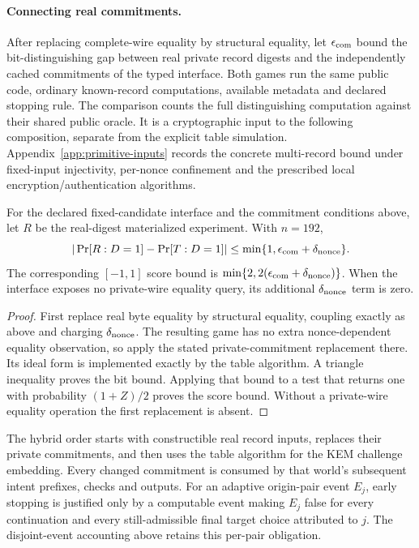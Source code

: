 \paragraph{Connecting real commitments.}
After replacing complete-wire equality by structural equality, let
$\epsilon_{\rm com}$ bound the bit-distinguishing gap between real private
record digests and the independently cached commitments of the typed
interface. Both games run the same public code, ordinary known-record
computations, available metadata and declared stopping rule. The comparison
counts the full distinguishing computation against their shared public oracle.
It is a cryptographic input to the following composition, separate from the
explicit table simulation. Appendix~\ref{app:primitive-inputs} records the
concrete multi-record bound under fixed-input injectivity, per-nonce
confinement and the prescribed local encryption/authentication algorithms.

\begin{corollary}
\label{cor:real-to-opaque}
For the declared fixed-candidate interface and the commitment conditions
above, let $R$ be the real-digest materialized experiment. With $n=192$,
\[
 |\Pr[R:D=1]-\Pr[T:D=1]|
 \leq\min\{1,\epsilon_{\rm com}+\delta_{\rm nonce}\}.
\]
The corresponding $[-1,1]$ score bound is
$\min\{2,2(\epsilon_{\rm com}+\delta_{\rm nonce})\}$.
When the interface exposes no private-wire equality query, its additional
$\delta_{\rm nonce}$ term is zero.
\end{corollary}
\begin{proof}
First replace real byte equality by structural equality, coupling exactly
as above and charging $\delta_{\rm nonce}$. The resulting game has no extra
nonce-dependent equality observation, so apply the stated private-commitment
replacement there. Its ideal form is implemented exactly by the table
algorithm. A triangle inequality proves the bit bound. Applying that bound
to a test that returns one with probability $(1+Z)/2$ proves the score bound.
Without a private-wire equality operation the first replacement is absent.
\end{proof}

The hybrid order starts with constructible real record inputs, replaces
their private commitments, and then uses the table algorithm for the KEM
challenge embedding. Every changed commitment is consumed by that world's
subsequent intent prefixes, checks and outputs. For an adaptive origin-pair
event $E_j$, early stopping is justified only by a computable event making
$E_j$ false for every continuation and every still-admissible final target
choice attributed to $j$. The disjoint-event accounting above retains this
per-pair obligation.
